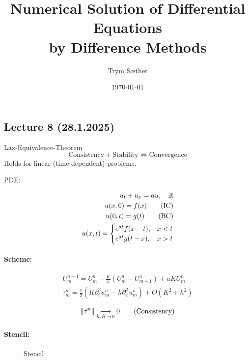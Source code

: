 \documentclass[a4paper, 10pt]{article}
\title{Numerical Solution of Differential Equations\\by Difference Methods}
\author{Trym Sæther}
\date{\today}
\begin{document}
\sloppy

\maketitle
\tableofcontents
\newpage




\subsection{Lecture 8 (28.1.2025)}

\begin{theorem}{Lax-Equivalence-Theorem}{}
    \[
        \text{Consistency} + \text{Stability} \iff \text{Convergence}
    \]
    Holds for linear (time-dependent) problems.
\end{theorem}

PDE:

\begin{align*}
    u_t + u_x  = au, \quad \mathbb{R} \\
    u(x, 0) = f(x) \tag{IC}   \\
    u(0, t) = g(t) \tag{BC}   \\
    u(x,t) =
    \begin{cases}
        e^{at}f(x-t), & x < t \\
        e^{at}g(t-x), & x > t
    \end{cases}
\end{align*}

\paragraph{Scheme:}
\begin{align*}
    U_m^{n+1} = U_m^n - \frac{K}{h}(U_m^n - U_{m-1}^n) + aKU_m^n \\
    \tau_m^n = \frac{1}{2}(K\partial_t^2 u_m^n - h\partial_x^2 u_m^n) + O(K^2 + h^2)
\end{align*}

\[
    \lVert\vec{\tau}^n\rVert \underset{h, K \to 0}{\longrightarrow} 0 \tag{Consistency}
\]

\paragraph{Stencil:}
\begin{figure}[H]
    \centering
    \caption{Stencil}
    \label{fig:stencil}
\end{figure}
\end{document}
